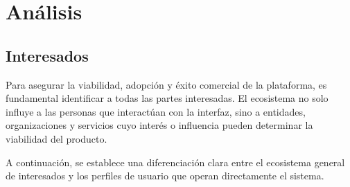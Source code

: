 \chapter{Análisis}
\label{chap:analisis}





\section{Interesados}
Para asegurar la viabilidad, adopción y éxito comercial de la plataforma, es fundamental identificar a todas las partes interesadas. El ecosistema no solo influye a las personas que interactúan con la interfaz, sino a entidades, organizaciones y servicios cuyo interés o influencia pueden determinar la viabilidad del producto.

A continuación, se establece una diferenciación clara entre el ecosistema general de interesados y los perfiles de usuario que operan directamente el sistema.

